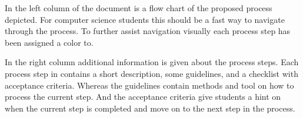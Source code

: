 In the left column of the document is a flow chart of the proposed process depicted. For computer science students this should be a fast way to navigate through the process. To further assist navigation visually each process step has been assigned a color to.

In the right column additional information is given about the process steps. Each process step in \checklist contains a short description, some guidelines, and a checklist with acceptance criteria. Whereas the guidelines contain methods and tool on how to process the current step. And the acceptance criteria give students a hint on when the current step is completed and move on to the next step in the process.


\endgroup


